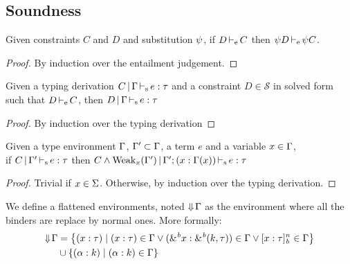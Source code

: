 \newcommand\mcase[1]{\noindent\textbf{Case }#1\\\noindent}

\subsection{Soundness}

\begin{lemma}
  \label{lemma:constrsubst}
  Given constraints $C$ and $D$ and substitution $\mathrm{\psi}$, if $D \operatorname{\vdash_e} C$
  then $\mathrm{\psi} D \operatorname{\vdash_e} \mathrm{\psi} C$.
  \begin{proof}
    By induction over the entailment judgement.
  \end{proof}
\end{lemma}

\begin{lemma}
  \label{lemma:constrimply}
  Given a typing derivation $C \operatorname{|} \Gamma \operatorname{\vdash_s} e : \tau$ and
  a constraint $D \in \mathcal S$ in solved form such that $D \operatorname{\vdash_e} C$, then
  $D \operatorname{|} \Gamma \operatorname{\vdash_s} e : \tau$
  \begin{proof}
    By induction over the typing derivation
  \end{proof}
\end{lemma}


\begin{lemma}
  \label{lemma:typ:weakening}
  Given a type environment $\Gamma$, $\Gamma' \subset \Gamma$, a term $e$ and a variable $x\in\Gamma$,\\
  if $C \operatorname{|} \Gamma' \operatorname{\vdash_s} e : \tau$
  then $C\wedge \operatorname{Weak}_{x}(\Gamma') \operatorname{|} \Gamma';(x : \Gamma(x)) \operatorname{\vdash_s} e : \tau$

  \begin{proof}
    Trivial if $x \in \Sigma$. Otherwise, by induction over the typing derivation.
  \end{proof}
\end{lemma}


We define a flattened environments, noted $\Downarrow\!\Gamma$ as the environment
where all the binders are replace by normal ones. More formally:
\begin{align*}
  \Downarrow\!\Gamma
  &= \left\{ (x : \tau) \mid
    (x : \tau)\in\Gamma
    \vee ({\&}^{\textit{b}}x : {\&}^{\textit{b}}(k,\tau))\in\Gamma
    \vee [x : \tau]_{\textit{b}}^n\in\Gamma
    \right\}\\
  &\cup \left\{ (\alpha : k) \mid (\alpha : k)\in\Gamma \right\}
\end{align*}

